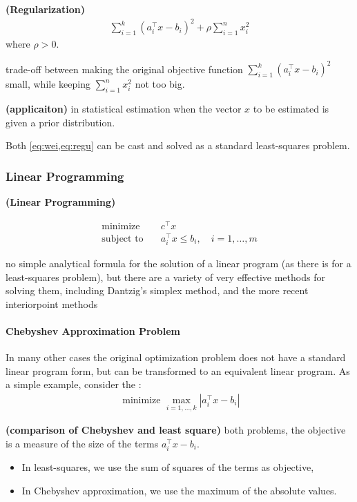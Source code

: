\documentclass{article}
\newcommand{\bfs}[1]{\textbf{({#1}) }}
\begin{document}
\begin{defa}{\bfs{Regularization}}
 \begin{align}
\sum_{i=1}^{k}\left(a_{i}^{\top} x-b_{i}\right)^{2}+\rho \sum_{i=1}^{n} x_{i}^{2}\label{eq:regu}
\end{align}
where $\rho>0$.
\end{defa}
\begin{rema}
trade-off between making the original objective function $\sum_{i=1}^{k}\left(a_{i}^{\top} x-b_{i}\right)^{2}$ small, while keeping $\sum_{i=1}^{n} x_{i}^{2}$ not too big.
\end{rema} 
\begin{rema}{\bfs{applicaiton}}
in statistical estimation when the vector $x$ to be estimated is given a prior distribution.
\end{rema}
\begin{rema}
Both \cref{eq:wei,eq:regu} can be cast and solved as a standard least-squares problem.
\end{rema}

\subsubsection{Linear Programming}

\begin{defa}{\bfs{Linear Programming}}
 
\begin{align*}
\text{minimize}  \quad &c^{\top} x \\
\text {subject to} \quad & a_{i}^{\top} x \leq b_{i}, \quad i=1, \ldots, m
\end{align*}
\end{defa}
no simple analytical formula for the solution of a linear program (as there is for a least-squares problem), but there are a variety of very effective methods for solving them, including Dantzig's simplex method, and the more recent interiorpoint methods
\paragraph{Chebyshev Approximation Problem}
 In many other cases the original optimization problem does not have a standard linear program form, but can be transformed to an equivalent linear program. As a simple example, consider the :
\begin{align*}
\text { minimize } \max _{i=1, \ldots, k}\left|a_{i}^{\top} x-b_{i}\right|
\end{align*}
\begin{rema}{\bfs{comparison of Chebyshev and least square}}
both problems, the objective is a measure of the size of the terms $a_{i}^{\top} x-b_{i} .$
\begin{itemize}
    \item In least-squares, we use the sum of squares of the terms as objective,
    \item In Chebyshev approximation, we use the maximum of the absolute values.
\end{itemize}  
\end{rema} 
\end{document}
